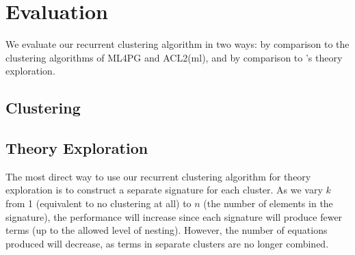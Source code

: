 \section{Evaluation}

We evaluate our recurrent clustering algorithm in two ways: by comparison to the clustering algorithms of ML4PG and ACL2(ml), and by comparison to \qspec{}'s theory exploration.

\subsection{Clustering}

\iffalse TODO \fi

\subsection{Theory Exploration}

The most direct way to use our recurrent clustering algorithm for theory exploration is to construct a separate signature for each cluster. As we vary $k$ from 1 (equivalent to no clustering at all) to $n$ (the number of elements in the signature), the performance will increase since each signature will produce fewer terms (up to the allowed level of nesting). However, the number of equations produced will decrease, as terms in separate clusters are no longer combined.

\iffalse
TODO

Future work?
Hypothetical use cases?
\fi
